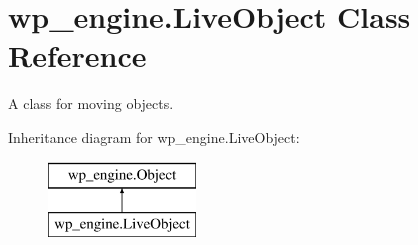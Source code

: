 \hypertarget{classwp__engine_1_1_live_object}{\section{wp\-\_\-engine.\-Live\-Object Class Reference}
\label{classwp__engine_1_1_live_object}
}


A class for moving objects.  


Inheritance diagram for wp\-\_\-engine.\-Live\-Object\-:\begin{figure}[H]
\begin{center}
\leavevmode
\includegraphics[height=2.000000cm]{classwp__engine_1_1_live_object}
\end{center}
\end{figure}
